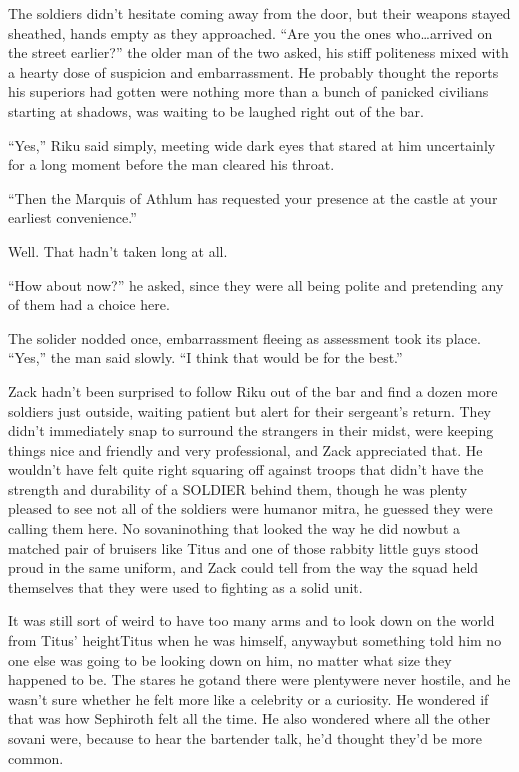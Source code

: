 The soldiers didn't hesitate coming away from the door, but their weapons stayed sheathed, hands empty as they approached. ``Are you the ones who\ldots arrived on the street earlier?'' the older man of the two asked, his stiff politeness mixed with a hearty dose of suspicion and embarrassment. He probably thought the reports his superiors had gotten were nothing more than a bunch of panicked civilians starting at shadows, was waiting to be laughed right out of the bar.

``Yes,'' Riku said simply, meeting wide dark eyes that stared at him uncertainly for a long moment before the man cleared his throat.

``Then the Marquis of Athlum has requested your presence at the castle at your earliest convenience.''

Well. That hadn't taken long at all.

``How about now?'' he asked, since they were all being polite and pretending any of them had a choice here.

The solider nodded once, embarrassment fleeing as assessment took its place. ``Yes,'' the man said slowly. ``I think that would be for the best.''


\scenechange


Zack hadn't been surprised to follow Riku out of the bar and find a dozen more soldiers just outside, waiting patient but alert for their sergeant's return. They didn't immediately snap to surround the strangers in their midst, were keeping things nice and friendly and very professional, and Zack appreciated that. He wouldn't have felt quite right squaring off against troops that didn't have the strength and durability of a SOLDIER behind them, though he was plenty pleased to see not all of the soldiers were human\textemdash or mitra, he guessed they were calling them here. No sovani\textemdash nothing that looked the way he did now\textemdash but a matched pair of bruisers like Titus and one of those rabbity little guys stood proud in the same uniform, and Zack could tell from the way the squad held themselves that they were used to fighting as a solid unit.

It was still sort of weird to have too many arms and to look down on the world from Titus' height\textemdash Titus when he was himself, anyway\textemdash but something told him no one else was going to be looking down on him, no matter what size they happened to be. The stares he got\textemdash and there were plenty\textemdash were never hostile, and he wasn't sure whether he felt more like a celebrity or a curiosity. He wondered if that was how Sephiroth felt all the time. He also wondered where all the other sovani were, because to hear the bartender talk, he'd thought they'd be more common.

